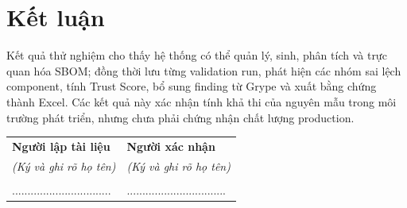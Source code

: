 \documentclass[12pt,a4paper]{article}
\begin{document}
\section{Kết luận}

Kết quả thử nghiệm cho thấy hệ thống có thể quản lý, sinh, phân tích và trực quan hóa
SBOM; đồng thời lưu từng validation run, phát hiện các nhóm sai lệch component, tính
Trust Score, bổ sung finding từ Grype và xuất bằng chứng thành Excel. Các kết quả này
xác nhận tính khả thi của nguyên mẫu trong môi trường phát triển, nhưng chưa phải chứng
nhận chất lượng production.

\vspace{1.2cm}
\begin{table}[H]
  \centering
  \begin{tabular}{C{0.45\textwidth}C{0.45\textwidth}}
    \textbf{Người lập tài liệu} & \textbf{Người xác nhận} \\
    \textit{(Ký và ghi rõ họ tên)} & \textit{(Ký và ghi rõ họ tên)} \\
    \\[2.2cm]
    ................................ & ................................
  \end{tabular}
\end{table}
\end{document}
